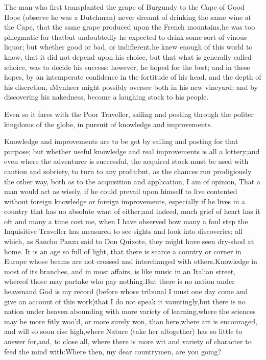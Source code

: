 \documentclass[twoside]{article}
\begin{document}
The man who first transplanted the grape of Burgundy to the Cape of Good
Hope (observe he was a Dutchman) never dreamt of drinking the same wine
at the Cape, that the same grape produced upon the French mountains,\tsk he
was too phlegmatic for that\tsk but undoubtedly he expected to drink some
sort of vinous liquor; but whether good or bad, or indifferent,\tsk he knew
enough of this world to know, that it did not depend upon his choice, but
that what is generally called \i{choice}, was to decide his success:
however, he hoped for the best; and in these hopes, by an intemperate
confidence in the fortitude of his head, and the depth of his discretion,
\i{Mynheer} might possibly oversee both in his new vineyard; and by
discovering his nakedness, become a laughing stock to his people.

Even so it fares with the Poor Traveller, sailing and posting through the
politer kingdoms of the globe, in pursuit of knowledge and improvements.

Knowledge and improvements are to be got by sailing and posting for that
purpose; but whether useful knowledge and real improvements is all a
lottery;\tsk and even where the adventurer is successful, the acquired stock
must be used with caution and sobriety, to turn to any profit:\tsk but, as
the chances run prodigiously the other way, both as to the acquisition
and application, I am of opinion, That a man would act as wisely, if he
could prevail upon himself to live contented without foreign knowledge or
foreign improvements, especially if he lives in a country that has no
absolute want of either;\tsk and indeed, much grief of heart has it oft and
many a time cost me, when I have observed how many a foul step the
Inquisitive Traveller has measured to see sights and look into
discoveries; all which, as Sancho Panza said to Don Quixote, they might
have seen dry-shod at home.  It is an age so full of light, that there is
scarce a country or corner in Europe whose beams are not crossed and
interchanged with others.\tsk Knowledge in most of its branches, and in most
affairs, is like music in an Italian street, whereof those may partake
who pay nothing.\tsk But there is no nation under heaven\tsk and God is my record
(before whose tribunal I must one day come and give an account of this
work)\tsk that I do not speak it vauntingly,\tsk but there is no nation under
heaven abounding with more variety of learning,\tsk where the sciences may be
more fitly woo’d, or more surely won, than here,\tsk where art is encouraged,
and will so soon rise high,\tsk where Nature (take her altogether) has so
little to answer for,\tsk and, to close all, where there is more wit and
variety of character to feed the mind with:\tsk Where then, my dear
countrymen, are you going?\tsk 
\end{document}

